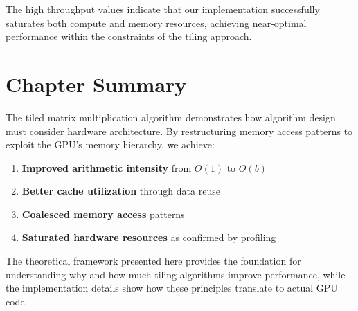 \documentclass{amsbook}
\theoremstyle{definition}
\begin{document}
The high throughput values indicate that our implementation successfully saturates both compute and memory resources, achieving near-optimal performance within the constraints of the tiling approach.

\section{Chapter Summary}

The tiled matrix multiplication algorithm demonstrates how algorithm design must consider hardware architecture. By restructuring memory access patterns to exploit the GPU's memory hierarchy, we achieve:

\begin{enumerate}
\item \textbf{Improved arithmetic intensity} from $O(1)$ to $O(b)$
\item \textbf{Better cache utilization} through data reuse
\item \textbf{Coalesced memory access} patterns
\item \textbf{Saturated hardware resources} as confirmed by profiling
\end{enumerate}

The theoretical framework presented here provides the foundation for understanding why and how much tiling algorithms improve performance, while the implementation details show how these principles translate to actual GPU code.

\end{document}
